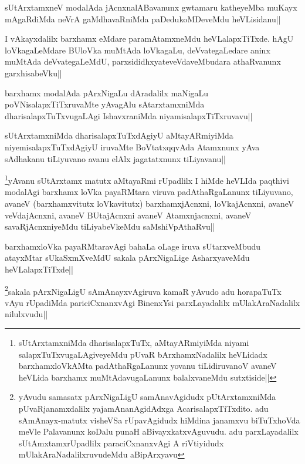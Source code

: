 \begin{artha}
sUtArxtamxneV modalAda jAcnxnalABavanunx gwtamaru katheyeMba muKayx mAgaRdiMda neVrA gaMdhavaRniMda paDedukoMDeveMdu heVLisidanu||
\end{artha}

\begin{artha}
I vAkayxdalilx barxhamx eMdare paramAtamxneMdu heVLalapxTiTxde. hAgU loVkagaLeMdare BUloVka muMtAda loVkagaLu, deVvategaLedare aninx muMtAda deVvategaLeMdU, parxsididhxyateveVdaveMbudara athaRvanunx garxhisabeVku||
\end{artha}%


\begin{artha}
barxhamx modalAda pArxNigaLu dAradalilx maNigaLu poVNisalapxTiTxruvaMte yAvagAlu sAtarxtamxniMda dharisalapxTuTxvugaLAgi IshavxraniMda niyamisalapxTiTxruvavu||
\end{artha}


\begin{artha}
sUtArxtamxniMda dharisalapxTuTxdAgiyU aMtayARmiyiMda niyemisalapxTuTxdAgiyU iruvaMte BoVtatxqqvAda Atamxnunx yAva sAdhakanu tiLiyuvano avanu elAlx jagatatxnunx tiLiyavanu||
\end{artha}
\begin{artha}
\footnote[1]{sUtArxtamxniMda dharisalapxTuTx, aMtayARmiyiMda niyami salapxTuTxvugaLAgiveyeMdu pUvaR bArxhamxNadalilx heVLidadx barxhamxloVkAMta padAthaRgaLanunx yovanu tiLidiruvanoV avaneV heVLida barxhamx muMtAdavugaLanunx balalxvaneMdu sutxtiside||}yAvanu sUtArxtamx matutx aMtayaRmi rUpadlilx I hiMde heVLIda paqthivi modalAgi barxhamx loVka payaRMtara viruva padAthaRgaLanunx tiLiyuvano, avaneV (barxhamxvitutx loVkavitutx) barxhamxjAcnxni, loVkajAcnxni, avaneV veVdajAcnxni, avaneV BUtajAcnxni avaneV Atamxnjacnxni, avaneV savaRjAcnxniyeMdu tiLiyabeVkeMdu saMshiVpAthaRvu||
\end{artha}

\begin{artha}%
barxhamxloVka payaRMtaravAgi bahaLa oLage iruva sUtarxveMbudu atayxMtar sUkaSxmXveMdU sakala pArxNigaLige AsharxyaveMdu heVLalapxTiTxde||
\end{artha}

\begin{artha}
\footnote[1]{yAvudu samasatx pArxNigaLigU samAnavAgidudx pUtArxtamxniMda pUvaRjanamxdalilx yajamAnanAgidAdxga AcarisalapxTiTxdito. adu sAmAnayx-matutx visheVSa rUpavAgidudx hiMdina janamxvu biTuTxhoVda meVle Palavanunx koDalu punaH aBivayxkatxvAguvudu. adu parxLayadalilx sUtAmxtamxrUpadlilx paraciCxnanxvAgi A riVtiyidudx mUlakAraNadalilxruvudeMdu aBipArxyavu}sakala pArxNigaLigU sAmAnayxvAgiruva kamaR yAvudo adu horapaTuTx vAyu rUpadiMda pariciCxnanxvAgi BinenxYsi parxLayadalilx mUlakAraNadalilx nilulxvudu||
\end{artha}


